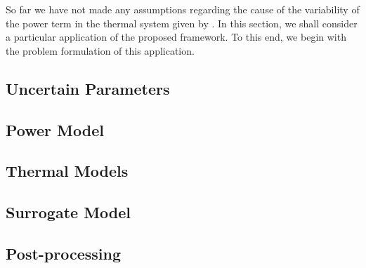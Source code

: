 
So far we have not made any assumptions regarding the cause of the variability of the power term in the thermal system given by .
In this section, we shall consider a particular application of the proposed framework.
To this end, we begin with the problem formulation of this application.



\subsection{Uncertain Parameters} 


\subsection{Power Model} 


\subsection{Thermal Models} 


\subsection{Surrogate Model} 


\subsection{Post-processing} 


